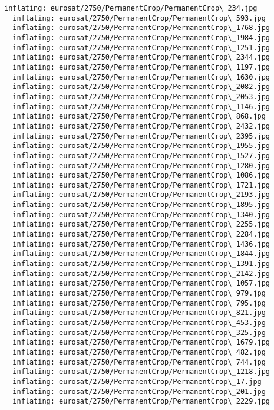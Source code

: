 \documentclass[11pt]{article}
\begin{document}
\begin{Verbatim}[commandchars=\\\{\}]
  inflating: eurosat/2750/PermanentCrop/PermanentCrop\_234.jpg
  inflating: eurosat/2750/PermanentCrop/PermanentCrop\_593.jpg
  inflating: eurosat/2750/PermanentCrop/PermanentCrop\_1768.jpg
  inflating: eurosat/2750/PermanentCrop/PermanentCrop\_1984.jpg
  inflating: eurosat/2750/PermanentCrop/PermanentCrop\_1251.jpg
  inflating: eurosat/2750/PermanentCrop/PermanentCrop\_2344.jpg
  inflating: eurosat/2750/PermanentCrop/PermanentCrop\_1197.jpg
  inflating: eurosat/2750/PermanentCrop/PermanentCrop\_1630.jpg
  inflating: eurosat/2750/PermanentCrop/PermanentCrop\_2082.jpg
  inflating: eurosat/2750/PermanentCrop/PermanentCrop\_2053.jpg
  inflating: eurosat/2750/PermanentCrop/PermanentCrop\_1146.jpg
  inflating: eurosat/2750/PermanentCrop/PermanentCrop\_868.jpg
  inflating: eurosat/2750/PermanentCrop/PermanentCrop\_2432.jpg
  inflating: eurosat/2750/PermanentCrop/PermanentCrop\_2395.jpg
  inflating: eurosat/2750/PermanentCrop/PermanentCrop\_1955.jpg
  inflating: eurosat/2750/PermanentCrop/PermanentCrop\_1527.jpg
  inflating: eurosat/2750/PermanentCrop/PermanentCrop\_1280.jpg
  inflating: eurosat/2750/PermanentCrop/PermanentCrop\_1086.jpg
  inflating: eurosat/2750/PermanentCrop/PermanentCrop\_1721.jpg
  inflating: eurosat/2750/PermanentCrop/PermanentCrop\_2193.jpg
  inflating: eurosat/2750/PermanentCrop/PermanentCrop\_1895.jpg
  inflating: eurosat/2750/PermanentCrop/PermanentCrop\_1340.jpg
  inflating: eurosat/2750/PermanentCrop/PermanentCrop\_2255.jpg
  inflating: eurosat/2750/PermanentCrop/PermanentCrop\_2284.jpg
  inflating: eurosat/2750/PermanentCrop/PermanentCrop\_1436.jpg
  inflating: eurosat/2750/PermanentCrop/PermanentCrop\_1844.jpg
  inflating: eurosat/2750/PermanentCrop/PermanentCrop\_1391.jpg
  inflating: eurosat/2750/PermanentCrop/PermanentCrop\_2142.jpg
  inflating: eurosat/2750/PermanentCrop/PermanentCrop\_1057.jpg
  inflating: eurosat/2750/PermanentCrop/PermanentCrop\_979.jpg
  inflating: eurosat/2750/PermanentCrop/PermanentCrop\_795.jpg
  inflating: eurosat/2750/PermanentCrop/PermanentCrop\_821.jpg
  inflating: eurosat/2750/PermanentCrop/PermanentCrop\_453.jpg
  inflating: eurosat/2750/PermanentCrop/PermanentCrop\_325.jpg
  inflating: eurosat/2750/PermanentCrop/PermanentCrop\_1679.jpg
  inflating: eurosat/2750/PermanentCrop/PermanentCrop\_482.jpg
  inflating: eurosat/2750/PermanentCrop/PermanentCrop\_744.jpg
  inflating: eurosat/2750/PermanentCrop/PermanentCrop\_1218.jpg
  inflating: eurosat/2750/PermanentCrop/PermanentCrop\_17.jpg
  inflating: eurosat/2750/PermanentCrop/PermanentCrop\_201.jpg
  inflating: eurosat/2750/PermanentCrop/PermanentCrop\_2229.jpg

\end{Verbatim}
\end{document}
